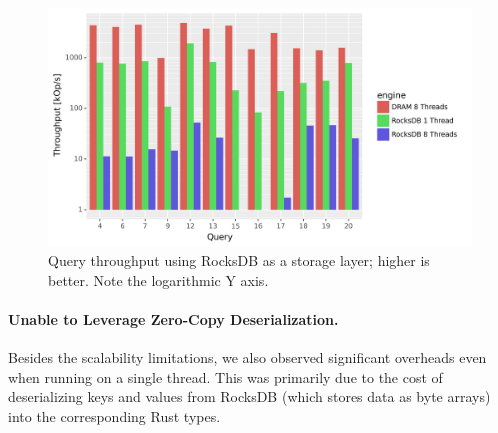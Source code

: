 \begin{figure}[h]
  \begin{center}
  \includegraphics[scale=.43]{graph/rocksdb}
  \caption{Query throughput using RocksDB as a storage layer; higher
    is better.  Note the logarithmic Y axis\label{fig:rocksdb}.}
  \end{center}
\end{figure}

\paragraph{Unable to Leverage Zero-Copy Deserialization.} Besides the
scalability limitations, we also observed significant overheads even
when running on a single thread. This was primarily due to the cost of
deserializing keys and values from RocksDB (which stores data as byte
arrays) into the corresponding Rust types.

